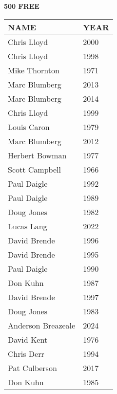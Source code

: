 \vspace{0.4cm}

\begin{minipage}[t]{0.48\textwidth}
\centering
\textbf{500 FREE}\\[0.05cm]
\begin{tabular}{@{}p{2.8cm}p{1.2cm}@{}}
\hline
\textbf{NAME} & \textbf{YEAR} \\
\hline
Chris Lloyd & 2000 \\
Chris Lloyd & 1998 \\
Mike Thornton & 1971 \\
Marc Blumberg & 2013 \\
Marc Blumberg & 2014 \\
Chris Lloyd & 1999 \\
Louis Caron & 1979 \\
Marc Blumberg & 2012 \\
Herbert Bowman & 1977 \\
Scott Campbell & 1966 \\
Paul Daigle & 1992 \\
Paul Daigle & 1989 \\
Doug Jones & 1982 \\
Lucas Lang & 2022 \\
David Brende & 1996 \\
David Brende & 1995 \\
Paul Daigle & 1990 \\
Don Kuhn & 1987 \\
David Brende & 1997 \\
Doug Jones & 1983 \\
Anderson Breazeale & 2024 \\
David Kent & 1976 \\
Chris Derr & 1994 \\
Pat Culberson & 2017 \\
Don Kuhn & 1985 \\
\hline
\end{tabular}
\end{minipage}\hfill

